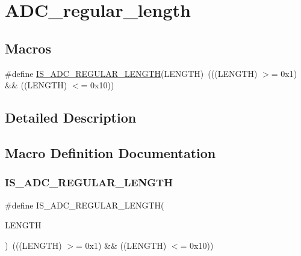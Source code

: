 \hypertarget{group___a_d_c__regular__length}{}\section{A\+D\+C\+\_\+regular\+\_\+length}
\label{group___a_d_c__regular__length}
\subsection*{Macros}
\begin{DoxyCompactItemize}
\item 
\#define \mbox{\hyperlink{group___a_d_c__regular__length_ga1ea82167f6dccdef1d160675f4534584}{I\+S\+\_\+\+A\+D\+C\+\_\+\+R\+E\+G\+U\+L\+A\+R\+\_\+\+L\+E\+N\+G\+TH}}(L\+E\+N\+G\+TH)~(((L\+E\+N\+G\+TH) $>$= 0x1) \&\& ((\+L\+E\+N\+G\+T\+H) $<$= 0x10))
\end{DoxyCompactItemize}


\subsection{Detailed Description}


\subsection{Macro Definition Documentation}
\mbox{\label{group___a_d_c__regular__length_ga1ea82167f6dccdef1d160675f4534584}} 
\subsubsection{\texorpdfstring{IS\_ADC\_REGULAR\_LENGTH}{IS\_ADC\_REGULAR\_LENGTH}}
{\footnotesize\ttfamily \#define I\+S\+\_\+\+A\+D\+C\+\_\+\+R\+E\+G\+U\+L\+A\+R\+\_\+\+L\+E\+N\+G\+TH(\begin{DoxyParamCaption}\item[{}]{L\+E\+N\+G\+TH }\end{DoxyParamCaption})~(((L\+E\+N\+G\+TH) $>$= 0x1) \&\& ((\+L\+E\+N\+G\+T\+H) $<$= 0x10))}

